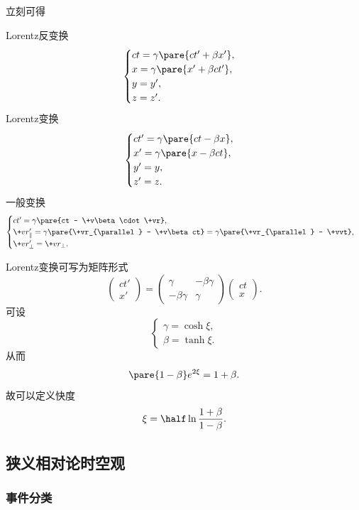 \documentclass[hidelinks]{ctexart}
\begin{document}
立刻可得
\begin{resume}
Lorentz反变换
\[ \begin{cases}
    ct = \gamma\pare{ct' + \beta x'}, \\
    x = \gamma\pare{x' + \beta ct'}, \\
    y = y', \\
    z = z'.
\end{cases} \]
Lorentz变换
\[ \begin{cases}
    ct' = \gamma\pare{ct - \beta x}, \\
    x' = \gamma\pare{x - \beta ct}, \\
    y' = y, \\
    z' = z.
\end{cases} \]
一般变换
\[ \begin{cases}
    ct' = \gamma\pare{ct - \+v\beta\cdot \+vr}, \\
    \+vr'_\parallel = \gamma\pare{\+vr_{\parallel} - \+v\beta ct} = \gamma\pare{\+vr_{\parallel} - \+vvt}, \\
    \+vr_\perp' = \+vr_\perp.
\end{cases} \]
\end{resume}
Lorentz变换可写为矩阵形式
\[ \begin{pmatrix}
    ct' \\
    x'
\end{pmatrix} = \begin{pmatrix}
    \gamma & -\beta \gamma \\
    -\beta\gamma & \gamma
\end{pmatrix} \begin{pmatrix}
    ct \\
    x
\end{pmatrix}. \]
可设
\[ \begin{cases}
    \gamma = \cosh \xi, \\
    \beta = \tanh \xi.
\end{cases} \]
从而
\[ \pare{1-\beta} e^{2\xi} = 1+\beta. \]
故可以定义快度
\[ \xi = \half \ln \frac{1+\beta}{1-\beta}. \]



\subsection{狭义相对论时空观} %
\label{sub:狭义相对论时空观}

\subsubsection{事件分类} %
\label{ssub:事件分类}
\end{document}
